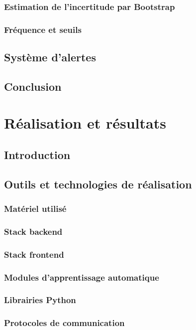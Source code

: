 \documentclass[12pt,a4paper]{report}
\begin{document}
\subsection{Estimation de l'incertitude par Bootstrap}
\subsection{Fréquence et seuils}
\section{Système d'alertes}
\section*{Conclusion}

\chapter{Réalisation et résultats}
\section*{Introduction}
\section{Outils et technologies de réalisation}
\subsection{Matériel utilisé}
\subsection{Stack backend}
\subsection{Stack frontend}
\subsection{Modules d'apprentissage automatique}
\subsection{Librairies Python}
\subsection{Protocoles de communication}
\end{document}
